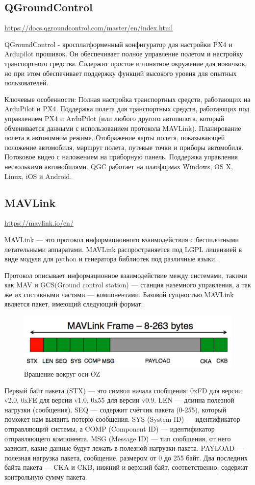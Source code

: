 \subsection{QGroundControl}
\url{https://docs.qgroundcontrol.com/master/en/index.html}

QGroundControl - кросплатформенный конфигуратор для настройки PX4 и Ardupilot прошивок. Он обеспечивает полное управление полетом и настройку транспортного средства. Содержит простое и понятное окружение для новичков, но при этом обеспечивает поддержку функций высокого уровня для опытных пользователей.

Ключевые особенности:
Полная настройка транспортных средств, работающих на ArduPilot и PX4.
Поддержка полета для транспортных средств, работающих под управлением PX4 и ArduPilot (или любого другого автопилота, который обменивается данными с использованием протокола MAVLink).
Планирование полета в автономном режиме.
Отображение карты полета, показывающей положение автомобиля, маршрут полета, путевые точки и приборы автомобиля.
Потоковое видео с наложением на приборную панель.
Поддержка управления несколькими автомобилями.
QGC работает на платформах Windows, OS X, Linux, iOS и Android.

\subsection{MAVLink}
\url{https://mavlink.io/en/}

MAVLink — это протокол информационного взаимодействия с беспилотными летательными аппаратами. MAVLink распространяется под LGPL лицензией в виде модуля для python и генератора библиотек под различные языки. 

Протокол описывает информационное взаимодействие между системами, такими как MAV и GCS(Ground control station) — станция наземного управления, а так же их составными частями — компонентами. Базовой сущностью MAVLink является пакет, имеющий следующий формат:

\begin{figure}[H]
	\centering
	\includegraphics[width=0.5\linewidth]{pics/mavlink}
	\caption{Вращение вокруг оси OZ
	}
	\label{fig:mavlink}
\end{figure}

Первый байт пакета (STX) — это символ начала сообщения: 0xFD для версии v2.0, 0xFE для версии v1.0, 0x55 для версии v0.9. LEN — длинна полезной нагрузки (сообщения). SEQ — содержит счётчик пакета (0-255), который поможет нам выявить потерю сообщения. SYS (System ID) — идентификатор отправляющий системы, а COMP (Component ID) — идентификатор отправляющего компонента. MSG (Message ID) — тип сообщения, от него зависит, какие данные будут лежать в полезной нагрузки пакета. PAYLOAD — полезная нагрузка пакета, сообщение, размером от 0 до 255 байт. Два последних байта пакета — CKA и CKB, нижний и верхний байт, соответственно, содержат контрольную сумму пакета.

